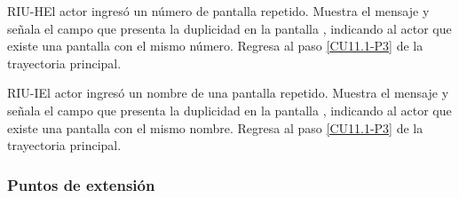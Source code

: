 	\begin{UCtrayectoriaA}{RIU-H}{El actor ingresó un número de pantalla repetido.}
		\UCpaso[\UCsist] Muestra el mensaje  y señala el campo que presenta la duplicidad en la pantalla , indicando al actor que existe una pantalla con el mismo número.
		\UCpaso Regresa al paso \ref{CU11.1-P3} de la trayectoria principal.
	\end{UCtrayectoriaA}

	\begin{UCtrayectoriaA}{RIU-I}{El actor ingresó un nombre de una pantalla repetido.}
		\UCpaso[\UCsist] Muestra el mensaje  y señala el campo que presenta la duplicidad en la pantalla , indicando al actor que existe una pantalla con el mismo nombre.
		\UCpaso Regresa al paso \ref{CU11.1-P3} de la trayectoria principal.
	\end{UCtrayectoriaA}


\subsubsection{Puntos de extensión}


